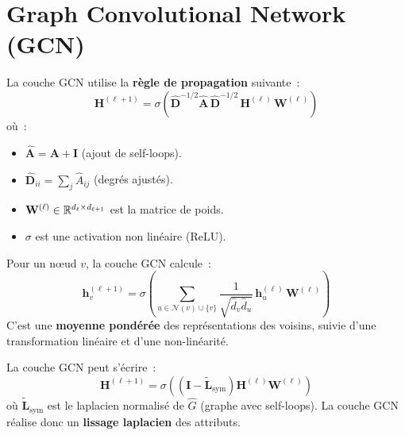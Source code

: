 \section{Graph Convolutional Network (GCN)}

\begin{definition}
La couche GCN utilise la \textbf{r\`egle de propagation} suivante~:
\[
    \mathbf{H}^{(\ell+1)} = \sigma\!\left(\hat{\mathbf{D}}^{-1/2}
    \hat{\mathbf{A}}\, \hat{\mathbf{D}}^{-1/2}\, \mathbf{H}^{(\ell)}\,
    \mathbf{W}^{(\ell)}\right)
\]
o\`u~:
\begin{itemize}
    \item $\hat{\mathbf{A}} = \mathbf{A} + \mathbf{I}$ (ajout de self-loops).
    \item $\hat{\mathbf{D}}_{ii} = \sum_j \hat{A}_{ij}$ (degr\'es ajust\'es).
    \item $\mathbf{W}^{(\ell)} \in \mathbb{R}^{d_\ell \times d_{\ell+1}}$ est la matrice de poids.
    \item $\sigma$ est une activation non lin\'eaire (ReLU).
\end{itemize}
\end{definition}

\begin{remarque}
Pour un n\oe ud $v$, la couche GCN calcule~:
\[
    \mathbf{h}_v^{(\ell+1)} = \sigma\!\left(\sum_{u \in \mathcal{N}(v) \cup \{v\}}
    \frac{1}{\sqrt{\hat{d}_v \hat{d}_u}}\, \mathbf{h}_u^{(\ell)}\, \mathbf{W}^{(\ell)}\right)
\]
C'est une \textbf{moyenne pond\'er\'ee} des repr\'esentations des voisins, suivie
d'une transformation lin\'eaire et d'une non-lin\'earit\'e.
\end{remarque}

\begin{proposition}
La couche GCN peut s'\'ecrire~:
\[
    \mathbf{H}^{(\ell+1)} = \sigma\!\left((\mathbf{I} - \tilde{\mathbf{L}}_{\text{sym}})
    \mathbf{H}^{(\ell)} \mathbf{W}^{(\ell)}\right)
\]
o\`u $\tilde{\mathbf{L}}_{\text{sym}}$ est le laplacien normalis\'e de $\hat{G}$
(graphe avec self-loops). La couche GCN r\'ealise donc un \textbf{lissage
laplacien} des attributs.
\end{proposition}


